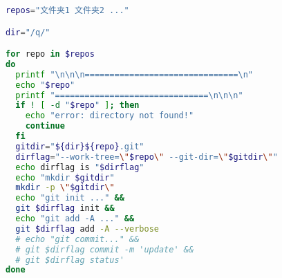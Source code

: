 
\begin{issues}
\issueDraft
\end{issues}

\begin{lstlisting}[language=bash]
repos="文件夹1 文件夹2 ..."

dir="/q/"

for repo in $repos
do
  printf "\n\n\n===============================\n"
  echo "$repo"
  printf "===============================\n\n\n"
  if ! [ -d "$repo" ]; then
    echo "error: directory not found!"
    continue
  fi
  gitdir="${dir}${repo}.git"
  dirflag="--work-tree=\"$repo\" --git-dir=\"$gitdir\""
  echo dirflag is "$dirflag"
  echo "mkdir $gitdir"
  mkdir -p \"$gitdir\"
  echo "git init ..." &&
  git $dirflag init &&
  echo "git add -A ..." &&
  git $dirflag add -A --verbose
  # echo "git commit..." &&
  # git $dirflag commit -m 'update' &&
  # git $dirflag status'
done
\end{lstlisting}
